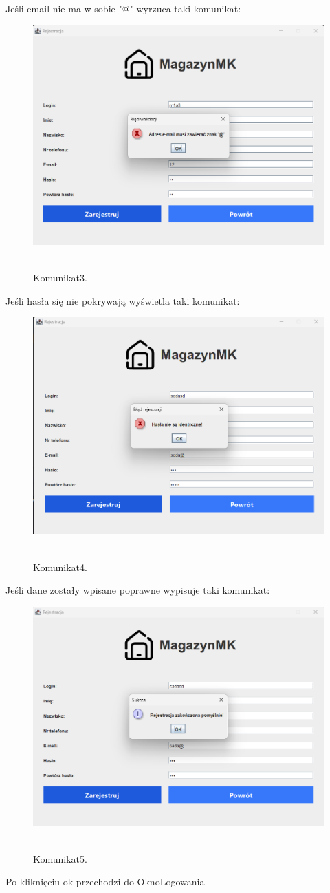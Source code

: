 Jeśli email nie ma w sobie "@" wyrzuca taki komunikat:
\begin{figure}[H]
    \centering
    \includegraphics[width=.7\linewidth]{figures/RejestracjaKom3.png}\
    \caption{Komunikat3.\label{Komunikat3}}
\end{figure}
Jeśli hasła się nie pokrywają wyświetla taki komunikat:
\begin{figure}[H]
    \centering
    \includegraphics[width=.7\linewidth]{figures/RejestracjaKom4.png}\
    \caption{Komunikat4.\label{Komunikat4}}
\end{figure}
Jeśli dane zostały wpisane poprawne wypisuje taki komunikat:
\begin{figure}[H]
    \centering
    \includegraphics[width=.7\linewidth]{figures/RejestracjaKom5.png}\
    \caption{Komunikat5.\label{Komunikat5}}
\end{figure}
Po kliknięciu ok przechodzi do OknoLogowania
\clearpage
